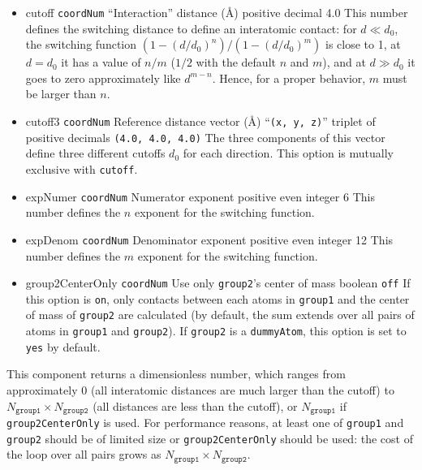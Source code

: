 \begin{itemize}

\item %
  \keydef
    {cutoff}{%
    \texttt{coordNum}}{%
    ``Interaction'' distance (\AA)}{%
    positive decimal}{%
    4.0}{%
    This number defines the switching distance to define an
    interatomic contact: for $d \ll d_0$, the switching function
    $(1-(d/d_0)^{n})/(1-(d/d_0)^{m})$ is close to 1, at $d = d_0$ it
    has a value of $n/m$ ($1/2$ with the default $n$ and $m$), and at
    $d \gg d_0$ it goes to zero approximately like $d^{m-n}$.  Hence,
    for a proper behavior, $m$ must be larger than $n$.}

\item %
  \keydef
    {cutoff3}{%
    \texttt{coordNum}}{%
    Reference distance vector (\AA)}{%
    ``\texttt{(x, y, z)}'' triplet of positive decimals}{%
    \texttt{(4.0, 4.0, 4.0)}}{%
    The three components of this vector define three different cutoffs
    $d_{0}$ for each direction.  This option is mutually exclusive with
    \texttt{cutoff}.}

\item %
  \keydef
    {expNumer}{%
    \texttt{coordNum}}{%
    Numerator exponent}{%
    positive even integer}{%
    6}{%
    This number defines the $n$ exponent for the switching function.}

\item %
  \keydef
    {expDenom}{%
    \texttt{coordNum}}{%
    Denominator exponent}{%
    positive even integer}{%
    12}{%
    This number defines the $m$ exponent for the switching function.}

\item %
  \keydef
    {group2CenterOnly}{%
    \texttt{coordNum}}{%
    Use only \texttt{group2}'s center of
    mass}{%
    boolean}{%
    \texttt{off}}{%
    If this option is \texttt{on}, only contacts between each atoms in \texttt{group1} and the center of mass of     \texttt{group2} are calculated (by default, the sum extends over all pairs of atoms in \texttt{group1} and \texttt{group2}).
If \texttt{group2} is a \texttt{dummyAtom}, this option is set to \texttt{yes} by default.
}

\end{itemize}

This component returns a dimensionless number, which ranges from
approximately 0 (all interatomic distances are much larger than the
cutoff) to $N_{\mathtt{group1}} \times N_{\mathtt{group2}}$ (all distances
are less than the cutoff), or $N_{\mathtt{group1}}$ if
\texttt{group2CenterOnly} is used.  For performance reasons, at least
one of \texttt{group1} and \texttt{group2} should be of limited size or \texttt{group2CenterOnly} should be used: the cost of the loop over all pairs grows as $N_{\mathtt{group1}} \times N_{\mathtt{group2}}$.



